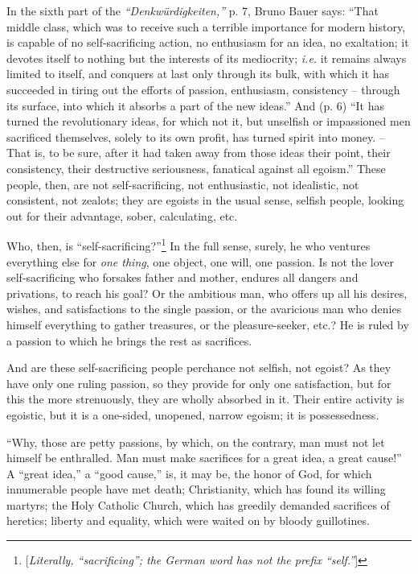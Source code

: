 \documentclass[12pt,a4paper]{book}
\begin{document}
In the sixth part of the \textit{``Denkw\"urdigkeiten,''} p. 7, Bruno Bauer 
says: ``That middle class, which was to receive such a terrible importance 
for modern history, is capable of no self-sacrificing action, no enthusiasm 
for an idea, no exaltation; it devotes itself to nothing but the interests of 
its mediocrity; \textit{i.e.} it remains always limited to itself, and 
conquers at last only through its bulk, with which it has succeeded in tiring 
out the efforts of passion, enthusiasm, consistency -- through its surface, 
into which it absorbs a part of the new ideas.'' And (p. 6) ``It has turned 
the revolutionary ideas, for which not it, but unselfish or impassioned men 
sacrificed themselves, solely to its own profit, has turned spirit into money. 
-- That is, to be sure, after it had taken away from those ideas their point, 
their consistency, their destructive seriousness, fanatical against all 
egoism.'' These people, then, are not self-sacrificing, not enthusiastic, not 
idealistic, not consistent, not zealots; they are egoists in the usual sense, 
selfish people, looking out for their advantage, sober, calculating, etc.

Who, then, is ``self-sacrificing?''\footnote{[\textit{Literally, 
``sacrificing''; the German word has not the prefix ``self.''}]} In the 
full sense, surely, he who ventures everything else for \textit{one thing}, 
one object, one will, one passion. Is not the lover self-sacrificing who 
forsakes father and mother, endures all dangers and privations, to reach his 
goal? Or the ambitious man, who offers up all his desires, wishes, and 
satisfactions to the single passion, or the avaricious man who denies himself 
everything to gather treasures, or the pleasure-seeker, etc.? He is ruled by a 
passion to which he brings the rest as sacrifices.

And are these self-sacrificing people perchance not selfish, not egoist? As 
they have only one ruling passion, so they provide for only one satisfaction, 
but for this the more strenuously, they are wholly absorbed in it. Their 
entire activity is egoistic, but it is a one-sided, unopened, narrow egoism; 
it is possessedness.

``Why, those are petty passions, by which, on the contrary, man must not let 
himself be enthralled. Man must make sacrifices for a great idea, a great 
cause!'' A ``great idea,'' a ``good cause,'' is, it may be, the honor of 
God, for which innumerable people have met death; Christianity, which has 
found its willing martyrs; the Holy Catholic Church, which has greedily 
demanded sacrifices of heretics; liberty and equality, which were waited on by 
bloody guillotines.
\end{document}
